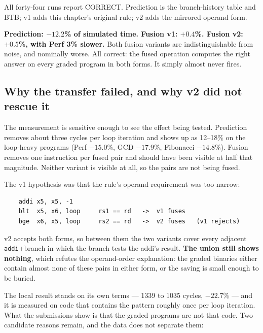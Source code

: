 \documentclass[11pt]{article}
\begin{document}
All forty-four runs report CORRECT. Prediction is the branch-history table and BTB;
v1 adds this chapter's original rule; v2 adds the mirrored operand form.

\textbf{Prediction: $-12.2$\% of simulated time. Fusion v1: $+0.4$\%. Fusion v2: $+0.5$\%,
with Perf 3\% slower.} Both fusion variants are indistinguishable from noise, and nominally
worse. All correct: the fused operation computes the right answer on every graded program
in both forms. It simply almost never fires.

\subsection{Why the transfer failed, and why v2 did not rescue it}

The measurement is sensitive enough to see the effect being tested. Prediction removes about
three cycles per loop iteration and shows up as 12--18\% on the loop-heavy programs
(Perf $-15.0$\%, GCD $-17.9$\%, Fibonacci $-14.8$\%). Fusion removes one instruction per
fused pair and should have been visible at half that magnitude. Neither variant is visible at
all, so the pairs are not being fused.

The v1 hypothesis was that the rule's operand requirement was too narrow:

\begin{verbatim}
    addi x5, x5, -1
    blt  x5, x6, loop     rs1 == rd   ->  v1 fuses
    bge  x6, x5, loop     rs2 == rd   ->  v2 fuses   (v1 rejects)
\end{verbatim}

v2 accepts both forms, so between them the two variants cover every adjacent
\texttt{addi}+branch in which the branch tests the addi's result. \textbf{The union still shows
nothing}, which refutes the operand-order explanation: the graded binaries either contain
almost none of these pairs in either form, or the saving is small enough to be buried.

The local result stands on its own terms --- 1339 to 1035 cycles, $-22.7$\% --- and it is
measured on code that contains the pattern roughly once per loop iteration. What the
submissions show is that the graded programs are not that code. Two candidate reasons remain,
and the data does not separate them:
\end{document}
